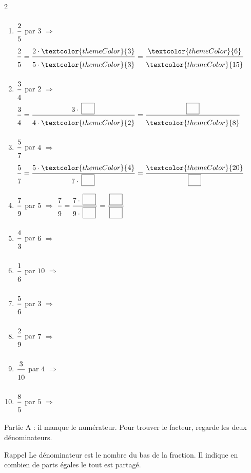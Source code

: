 \newpage


\begin{multicols}{2}
\begin{enumerate}[leftmargin=*,align=parleft, label=\alph*), itemsep=9pt]
\item $\FA{2}{5}$ par $3$ \quad $\Longrightarrow$ \quad $\FA{2}{5}=\FA{2 \cdot \textcolor{themeColor}{3}}{5 \cdot \textcolor{themeColor}{3}}=\FA{\textcolor{themeColor}{6}}{\textcolor{themeColor}{15}}$
\item $\FA{3}{4}$ par $2$ \quad $\Longrightarrow$ \quad $\FA{3}{4}=\FA{3 \cdot \CaseC}{4 \cdot \textcolor{themeColor}{2}}=\FA{\CaseC}{\textcolor{themeColor}{8}}$
\item $\FA{5}{7}$ par $4$ \quad $\Longrightarrow$ \quad $\FA{5}{7}=\FA{5 \cdot \textcolor{themeColor}{4}}{7 \cdot \CaseC}=\FA{\textcolor{themeColor}{20}}{\CaseC}$
\item $\FA{7}{9}$ par $5$ \quad $\Longrightarrow$ \quad $\FA{7}{9}=\FA{7 \cdot \CaseC}{9 \cdot \CaseC}=\FA{\CaseC}{\CaseC}$
\item $\FA{4}{3}$ par $6$ \quad $\Longrightarrow$
\item $\FA{1}{6}$ par $10$ \quad $\Longrightarrow$
\item $\FA{5}{6}$ par $3$ \quad $\Longrightarrow$
\item $\FA{2}{9}$ par $7$ \quad $\Longrightarrow$
\item $\FA{3}{10}$ par $4$ \quad $\Longrightarrow$
\item $\FA{8}{5}$ par $5$ \quad $\Longrightarrow$
\end{enumerate}
\end{multicols}

\vfill
{}

\medskip
\textcolor{themeColor}{Partie A} : il manque le numérateur. Pour trouver le facteur, regarde les deux dénominateurs.

\vspace{10pt}\begin{astuce}{Rappel}
Le \textcolor{themeColor}{dénominateur} est le nombre du bas de la fraction. Il indique en combien de parts égales le tout est partagé.
\end{astuce}\vspace{15pt}

